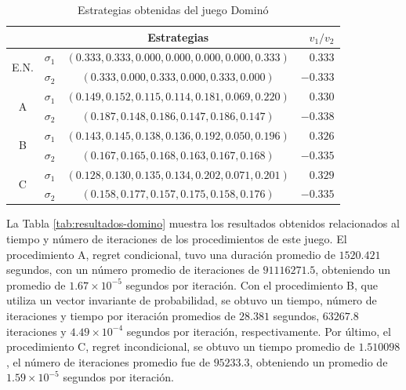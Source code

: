 \begin{table}[ht]
    \centering
    \begin{tabular}{c c|c|r}
        & & Estrategias & $v_1 / v_2$\\
        \hline
        \multirow{2}{*}{E.N.}
        & $\sigma_1$ & $(0.333, 0.333, 0.000, 0.000, 0.000, 0.000, 0.333)$ & $0.333$ \\
        & $\sigma_2$ & $(0.333, 0.000, 0.333, 0.000, 0.333, 0.000)$ &  $-0.333$\\
        \hline
        \multirow{2}{*}{A}
        & $\sigma_1$ & $(0.149, 0.152, 0.115, 0.114, 0.181, 0.069, 0.220)$ & $0.330$ \\
        & $\sigma_2$ & $(0.187, 0.148, 0.186, 0.147, 0.186, 0.147)$ & $-0.338$\\
        \hline
        \multirow{2}{*}{B}
        & $\sigma_1$ & $(0.143, 0.145, 0.138, 0.136, 0.192, 0.050, 0.196)$ & $0.326$ \\
        & $\sigma_2$ & $(0.167, 0.165, 0.168, 0.163, 0.167, 0.168)$ & $-0.335$\\
        \hline
        \multirow{2}{*}{C}
        & $\sigma_1$ & $(0.128, 0.130, 0.135, 0.134, 0.202, 0.071, 0.201)$ & $0.329$ \\
        & $\sigma_2$ & $(0.158, 0.177, 0.157, 0.175, 0.158, 0.176)$ & $-0.335$\\
        \hline
    \end{tabular}
    \caption{Estrategias obtenidas del juego Dominó}
    \label{tab:estrategias-domino}
\end{table}

La Tabla \ref{tab:resultados-domino} muestra los resultados obtenidos relacionados al tiempo y número de iteraciones de los procedimientos de este juego. El procedimiento A, regret condicional, tuvo una duración promedio de $1520.421$ segundos, con un número promedio de iteraciones de $91116271.5$, obteniendo un promedio de $1.67 {\times} 10^{-5}$ segundos por iteración. Con el procedimiento B, que utiliza un vector invariante de probabilidad, se obtuvo un tiempo, número de iteraciones y tiempo por iteración promedios de $28.381$ segundos, $63267.8$ iteraciones y $4.49 {\times} 10^{-4}$ segundos por iteración, respectivamente. Por último, el procedimiento C, regret incondicional, se obtuvo un tiempo promedio de $1.510098$, el número de iteraciones promedio fue de $95233.3$, obteniendo un promedio de $1.59 {\times} 10^{-5}$ segundos por iteración. 


